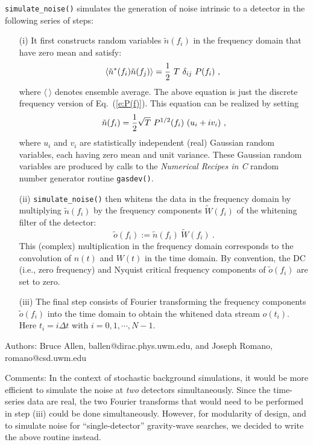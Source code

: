 {\tt simulate\_noise()} simulates the generation of noise intrinsic 
to a detector in the following series of steps:
%
\begin{itemize}
\item[(i)] It first constructs random variables 
$\tilde n(f_i)$ in the frequency domain that have zero mean 
and satisfy:
%
\begin{equation}
\langle \tilde n^*(f_i)\tilde n(f_j)\rangle=
{1\over 2}\ T\ \delta_{ij}\ P(f_i)\ ,\\
\end{equation}
%
where $\langle\ \rangle$ denotes ensemble average.
The above equation is just the discrete frequency version of 
Eq.~(\ref{e:P(f)}).
This equation can be realized by setting
%
\begin{equation}
\tilde n(f_i)={1\over 2}\sqrt{T}\ P^{1/2}(f_i)\ (u_i+i v_i)\ ,
\end{equation}
%
where $u_i$ and $v_i$ 
are statistically independent (real) Gaussian random variables, 
each having zero mean and unit variance.
These Gaussian random variables are produced by calls to the 
{\it Numerical Recipes in C} random number generator routine
{\tt gasdev()}.
%
\item[(ii)] {\tt simulate\_noise()} then whitens the data
in the frequency domain by multiplying $\tilde n(f_i)$ by the 
frequency components $\tilde W(f_i)$ of the whitening filter
of the detector:
%
\begin{equation}
\tilde o(f_i):=\tilde n(f_i)\ \tilde W(f_i)\ .
\end{equation}
%
This (complex) multiplication in the frequency domain corresponds
to the convolution of $n(t)$ and $W(t)$ in the time domain.
By convention, the DC (i.e., zero frequency) and Nyquist critical
frequency components of $\tilde o(f_i)$ are set to zero.
%
\item[(iii)] The final step consists of Fourier transforming the
frequency components $\tilde o(f_i)$ into the time domain to obtain 
the whitened data stream $o(t_i)$.
Here $t_i=i\Delta t$ with $i=0,1,\cdots,N-1$.
\end{itemize}
%
\begin{description}
\item{Authors:}
Bruce Allen, ballen@dirac.phys.uwm.edu, and Joseph Romano, romano@csd.uwm.edu
\item{Comments:}
In the context of stochastic background simulations, it would be
more efficient to simulate the noise at {\it two} detectors simultaneously.
Since the time-series data are real, the two Fourier transforms that 
would need to be performed in step (iii) could be done simultaneously. 
However, for modularity of design, and to simulate noise for 
``single-detector'' gravity-wave searches, we decided to write the above 
routine instead.
\end{description}
\clearpage

